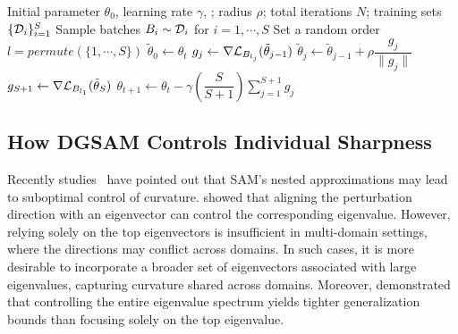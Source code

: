 \documentclass{article}
\theoremstyle{plain}
\theoremstyle{definition}
\theoremstyle{remark}
\begin{document}
\begin{algorithm}
  \small
  \caption{DGSAM}
  \begin{algorithmic}[1]
     Initial parameter $\theta_0$, learning rate $\gamma$, ; radius $\rho$; total iterations $N$; training sets $\{{\mathcal{D}}_i\}_{i=1}^S$ 
      \STATE Sample batches $B_i \sim {\mathcal{D}}_i$ for $i = 1,\cdots,S$
      \STATE Set a random order $l = permute(\{1,\cdots,S\})$
      \STATE $\tilde{\theta}_0\gets\theta_t$
            \STATE $g_j \gets  \nabla {\mathcal{L}}_{B_{l_j}}(\tilde{\theta}_{j-1})$
            \STATE $\tilde{\theta}_{j} \gets \tilde{\theta}_{j-1}+\rho\dfrac{g_j}{\lVert g_j \rVert}$
            \STATE $g_{S+1} \gets  \nabla {\mathcal{L}}_{B_{l_1}}(\tilde{\theta}_{S})$
        \ENDIF 
      \ENDFOR
      \STATE $\theta_{t+1} \gets \theta_t - \gamma \left( \dfrac{S}{S+1} \right) \displaystyle \sum\limits_{j=1}^{S+1} g_j$
    \ENDFOR
  \end{algorithmic}
  \label{alg:algorithm1}
\end{algorithm}


\subsection{How DGSAM Controls Individual Sharpness}

Recently studies~\citep{ma2023survey, zhuang2022gsam} have pointed out that SAM's nested approximations may lead to suboptimal control of curvature. \citet{luo2024eigensam} showed that aligning the perturbation direction with an eigenvector can control the corresponding eigenvalue. However, relying solely on the top eigenvectors is insufficient in multi-domain settings, where the directions may conflict across domains. In such cases,  it is more desirable to incorporate a broader set of eigenvectors associated with large eigenvalues, capturing curvature shared across domains. Moreover, \citet{wen2023samtheory} demonstrated that controlling the entire eigenvalue spectrum yields tighter generalization bounds than focusing solely on the top eigenvalue.  
\end{document}
